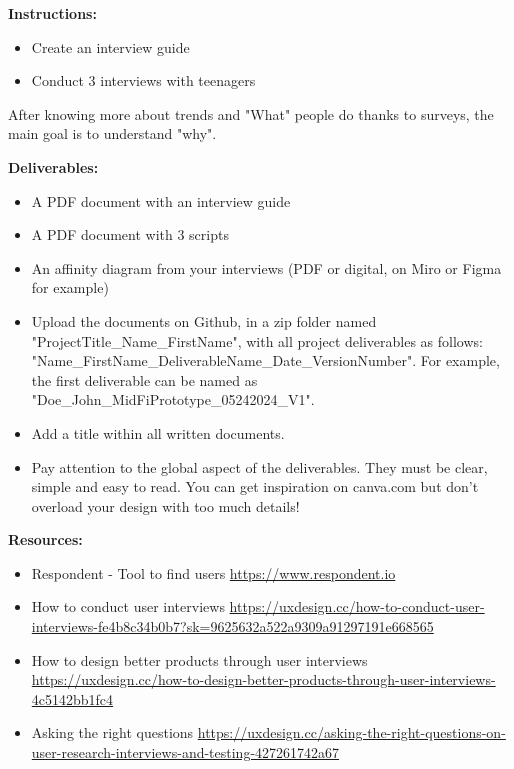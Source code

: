 \makeheaderfiles

\textbf{Instructions:}

\begin{itemize}
\item Create an interview guide
\item Conduct 3 interviews with teenagers
\end{itemize}

After knowing more about trends and "What" people do thanks to surveys, the main goal is to understand "why".

\textbf{Deliverables:}

\begin{itemize}
\item A PDF document with an interview guide
\item A PDF document with 3 scripts 
\item An affinity diagram from your interviews (PDF or digital, on Miro or Figma for example)
\item Upload the documents on Github, in a zip folder named "ProjectTitle\_Name\_FirstName", with all project deliverables as follows: "Name\_FirstName\_DeliverableName\_Date\_VersionNumber".  For example, the first deliverable can be named as "Doe\_John\_MidFiPrototype\_05242024\_V1".
\item Add a title within all written documents.
\item Pay attention to the global aspect of the deliverables. They must be clear, simple and easy to read. You can get inspiration on canva.com but don't overload your design with too much details!
\end{itemize}

\textbf{Resources:}

\begin{itemize}
\item Respondent - Tool to find users \url{https://www.respondent.io}
\item How to conduct user interviews \url{https://uxdesign.cc/how-to-conduct-user-interviews-fe4b8c34b0b7?sk=9625632a522a9309a91297191e668565}
\item How to design better products through user interviews \url{https://uxdesign.cc/how-to-design-better-products-through-user-interviews-4c5142bb1fc4}
\item Asking the right questions \url{https://uxdesign.cc/asking-the-right-questions-on-user-research-interviews-and-testing-427261742a67}
\end{itemize}

